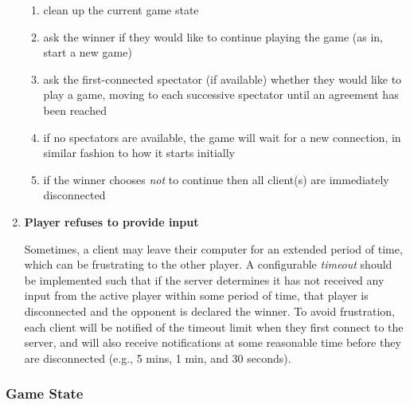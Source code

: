 \documentclass[letterpaper]{article}
\begin{document}
\begin{enumerate}
          \begin{enumerate}
              \item clean up the current game state
              \item ask the winner if they would like to
                    continue playing the game (as in, start a
                    new game)
              \item ask the first-connected spectator (if
                    available) whether they would like to play a
                    game, moving to each successive spectator
                    until an agreement has been reached
              \item if no spectators are available, the game
                    will wait for a new connection, in similar
                    fashion to how it starts initially
              \item if the winner chooses \emph{not} to continue
                    then all client(s) are immediately
                    disconnected
          \end{enumerate}
          
    \item \textbf{Player refuses to provide input}
    
          Sometimes, a client may leave their computer for an
          extended period of time, which can be frustrating to
          the other player. A configurable \emph{timeout} should
          be implemented such that if the server determines it
          has not received any input from the active player
          within some period of time, that player is
          disconnected and the opponent is declared the winner. 
          To avoid frustration, each client will be notified of
          the timeout limit when they first connect to the
          server, and will also receive notifications at some
          reasonable time before they are disconnected (e.g., 5
          mins, 1 min, and 30 seconds).
\end{enumerate}

\subsubsection{Game State}
\label{sec:fun_reqs_server_gamestate}
\end{document}
